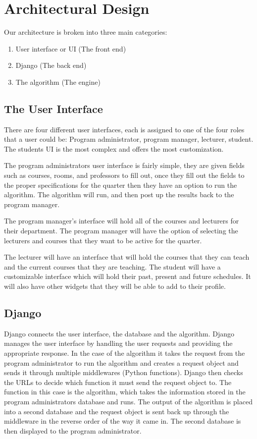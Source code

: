 \documentclass[12pt,article]{memoir}
\begin{document}
\chapter{Architectural Design} %
Our architecture is broken into three main categories:
\begin{enumerate}
\item User interface or UI (The front end)
\item Django (The back end)
\item The algorithm (The engine)
\end{enumerate}

\section{The User Interface}
There are four different user interfaces, each is assigned to one of the four roles that a user could be: Program administrator, program manager, lecturer, student. The students UI is the most complex and offers the most customization.

The program administrators user interface is fairly simple, they are given fields such as courses, rooms, and professors to fill out, once they fill out the fields to the proper specifications for the quarter then they have an option to run the algorithm. The algorithm will run, and then post up the results back to the program manager.

The program manager's interface will hold all of the courses and lecturers for their department. The program manager will have the option of selecting the lecturers and courses that they want to be active for the quarter.

The lecturer will have an interface that will hold the courses that they can teach and the current courses that they are teaching. 
The student will have a customizable interface which will hold their past, present and future schedules. It will also have other widgets that they will be able to add to their profile.
\section{Django}
Django connects the user interface, the database and the algorithm. Django manages the user interface by handling the user requests and providing the appropriate response. In the case of the algorithm it takes the request from the program administrator to run the algorithm and creates a request object and sends it through multiple middlewares (Python functions). Django then checks the URLs to decide which function it must send the request object to. The function in this case is the algorithm, which takes the information stored in the program administrators database and runs. The output of the algorithm is placed into a second database and the request object is sent back up through the middleware in the reverse order of the way it came in. The second database is then displayed to the program administrator.
\end{document}
